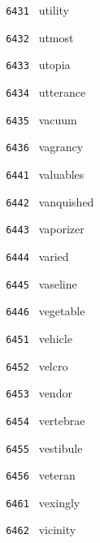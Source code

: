 \documentclass[11pt]{article}
\begin{document}
\begin{multicols}{6}
\noindent \texttt{ 6431 } \hspace{1mm} utility  \par
\noindent \texttt{ 6432 } \hspace{1mm} utmost  \par
\noindent \texttt{ 6433 } \hspace{1mm} utopia  \par
\noindent \texttt{ 6434 } \hspace{1mm} utterance  \par
\noindent \texttt{ 6435 } \hspace{1mm} vacuum  \par
\noindent \texttt{ 6436 } \hspace{1mm} vagrancy  \par
\noindent \texttt{ 6441 } \hspace{1mm} valuables  \par
\noindent \texttt{ 6442 } \hspace{1mm} vanquished  \par
\noindent \texttt{ 6443 } \hspace{1mm} vaporizer  \par
\noindent \texttt{ 6444 } \hspace{1mm} varied  \par
\noindent \texttt{ 6445 } \hspace{1mm} vaseline  \par
\noindent \texttt{ 6446 } \hspace{1mm} vegetable  \par
\noindent \texttt{ 6451 } \hspace{1mm} vehicle  \par
\noindent \texttt{ 6452 } \hspace{1mm} velcro  \par
\noindent \texttt{ 6453 } \hspace{1mm} vendor  \par
\noindent \texttt{ 6454 } \hspace{1mm} vertebrae  \par
\noindent \texttt{ 6455 } \hspace{1mm} vestibule  \par
\noindent \texttt{ 6456 } \hspace{1mm} veteran  \par
\noindent \texttt{ 6461 } \hspace{1mm} vexingly  \par
\noindent \texttt{ 6462 } \hspace{1mm} vicinity  \par

\end{multicols}
\end{document}
